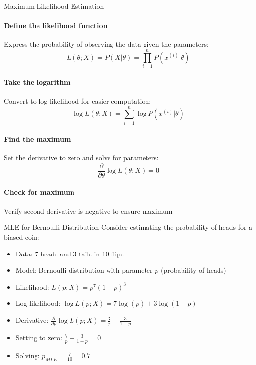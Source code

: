 \begin{KR}{Maximum Likelihood Estimation}\\
\paragraph{Define the likelihood function}
Express the probability of observing the data given the parameters:
\[L(\theta; X) = P(X|\theta) = \prod_{i=1}^{n} P(x^{(i)}|\theta)\]

\paragraph{Take the logarithm}
Convert to log-likelihood for easier computation:
\[\log L(\theta; X) = \sum_{i=1}^{n} \log P(x^{(i)}|\theta)\]

\paragraph{Find the maximum}
Set the derivative to zero and solve for parameters:
\[\frac{\partial}{\partial \theta} \log L(\theta; X) = 0\]

\paragraph{Check for maximum}
Verify second derivative is negative to ensure maximum
\end{KR}

\begin{example}{MLE for Bernoulli Distribution}
Consider estimating the probability of heads for a biased coin:
\begin{itemize}
    \item Data: 7 heads and 3 tails in 10 flips
    \item Model: Bernoulli distribution with parameter $p$ (probability of heads)
    \item Likelihood: $L(p; X) = p^7 (1-p)^3$
    \item Log-likelihood: $\log L(p; X) = 7\log(p) + 3\log(1-p)$
    \item Derivative: $\frac{\partial}{\partial p} \log L(p; X) = \frac{7}{p} - \frac{3}{1-p}$
    \item Setting to zero: $\frac{7}{p} - \frac{3}{1-p} = 0$
    \item Solving: $p_{MLE} = \frac{7}{10} = 0.7$
\end{itemize}
\end{example}

